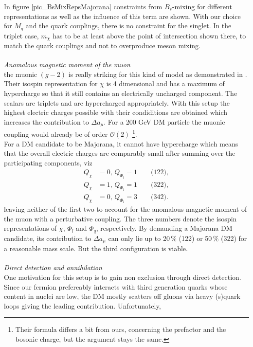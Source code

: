 In figure \ref{pic_BsMixRepsMajorana} constraints from $B_s$-mixing for different representations as well as the influence of this term are shown.
With our choice for $M_q$ and the quark couplings, there is no constraint for the singlet. In the triplet case, $m_\chi$ has to be at
least above the point of intersection shown there, to match the quark couplings and not to overproduce meson mixing.
\\ \\ \textit{Anomalous magnetic moment of the muon}\\
\noindent the muonic $(g-2)$ is really striking for this kind of model as demonstrated in \cite{Grip}. Their isospin representation for $\chi$ is
4 dimensional and has a maximum of hypercharge so that it still contains an electrically uncharged component. The scalars are triplets and 
are hypercharged appropriately. With this setup the highest electric charges possible with their condiditions are obtained which increases the 
contribution to $\Delta a_\mu$. For a 200 GeV DM particle the muonic coupling would already be of order $\mathcal{O}(2)$ \footnote{Their 
formula differs a bit from ours, concerning the prefactor and the bosonic charge, but the argument stays the same.}.\\
\noindent For a DM candidate to be Majorana, it cannot have hypercharge which means that the overall electric charges are comparably small
after summing over the participating components, viz
\begin{align}
 Q_\chi &= 0,\,Q_{\Phi_l} = 1 \qquad \text{(122)},\\
 Q_\chi &= 1,\,Q_{\Phi_l} = 1 \qquad \text{(322)},\\
 Q_\chi &= 0,\,Q_{\Phi_l} = 3 \qquad \text{(342)}.
\end{align}
leaving neither of the first two to account for the anomalous magnetic moment of the muon with a perturbative coupling. The three numbers denote
the isospin representations of $\chi$, $\Phi_l$ and $\Phi_q$, respectively. By demanding a Majorana DM candidate, its contribution to 
$\Delta a_\mu$ can only lie up to 20$\,\%$ (122) or 50$\,\%$ (322) for a reasonable 
mass scale. But the third configuration is viable.
\\ \\ \textit{Direct detection and annihilation}\\
\noindent One motivation for this setup is to gain non exclusion through direct detection. Since our fermion prefereably interacts with third 
generation
quarks whose content in nuclei are low, the DM mostly scatters off gluons via heavy (s)quark loops giving the leading contribution. Unfortunately,
